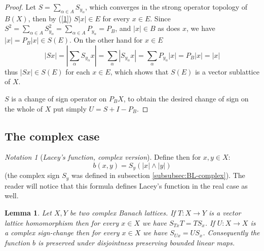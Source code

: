 \documentclass[11pt]{amsart}
\theoremstyle{plain}
\newtheorem{lemma}[theorem]{Lemma}
\theoremstyle{remark}
\newtheorem{notation}[theorem]{Notation}
\begin{document}
\begin{proof}
Let $S=\sum\limits_{\alpha\in A} S_{y_\alpha}$, which converges in the strong operator topology of $B(X)$, then by (\ref{1}) $S|x|\in E$ for every $x\in E$. Since $S^2=\sum\limits_{\alpha\in A} S_{y_\alpha}^2=\sum\limits_{\alpha\in A} P_{y_\alpha}=P_B$, and $|x|\in B$ as does $x$, we have $|x|=P_B|x|\in S(E)$. On the other hand for $x\in E$
\[|Sx|=|\sum_\alpha S_{y_\alpha} x|=\sum_\alpha |S_{y_\alpha}x|= \sum_\alpha P_{y_\alpha}|x|=P_B|x|=|x| \]
thus $|Sx|\in S(E)$ for each $x\in E$, which shows that $S(E)$ is a vector sublattice of $X$.

$S$ is a change of sign operator on $P_BX$, to obtain the desired change of sign on the whole of $X$ put simply $U=S+I-P_B$.
\end{proof}

\subsection{The complex case}

 
\begin{notation}[\it Lacey's function, complex version]\label{comp-Lacey-map} 
 Define then for $x,y\in X$:
 \[b(x,y)= S_y( |x|\wedge |y|)\]
 (the complex sign $S_y$ was defined in subsection \ref{subsubsec:BL-complex}). The reader will notice that this formula defines Lacey's function  in the real case as well. 
\end{notation}

 
 \begin{lemma}\label{T-formula}
Let $X,Y$ be two complex Banach lattices. If $T:X\to Y$ is a vector lattice homomorphism then for every $x\in X$ we have $S_{Tx}T=TS_x$. If $U: X\to X$ is a complex sign-change then for  every $x\in X$ we have $S_{Ux}=US_x$. Consequently the function $b$ is preserved under disjointness preserving bounded linear maps.
\end{lemma}
\end{document}
